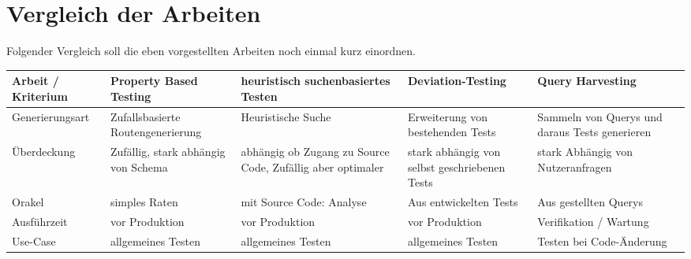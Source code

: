 \section{Vergleich der Arbeiten}
Folgender Vergleich soll die eben vorgestellten Arbeiten noch einmal kurz einordnen.

\begin{center}
    \begin{table}[!hbt]
        \begin{tabularx}{\textwidth}{|C|C|C|C|C|C|}
            \hline
            \textbf{ Arbeit / Kriterium} & \textbf{Property Based Testing} & \textbf{heuristisch suchenbasiertes Testen} & \textbf{Deviation-Testing} & \textbf{Query Harvesting} \\
            \hline
            Generierungsart & Zufallsbasierte Routengenerierung & Heuristische Suche & Erweiterung von bestehenden Tests & Sammeln von Querys und daraus Tests generieren \\
            \hline
            Überdeckung & Zufällig, stark abhängig von Schema  & abhängig ob Zugang zu Source Code, Zufällig aber optimaler & stark abhängig von selbst geschriebenen Tests  & stark Abhängig von Nutzeranfragen \\
            \hline
            Orakel & simples Raten & mit Source Code: Analyse & Aus entwickelten Tests &  Aus gestellten Querys \\
            \hline
            Ausführzeit & vor Produktion & vor Produktion & vor Produktion & Verifikation / Wartung \\
            \hline
            Use-Case & allgemeines Testen & allgemeines Testen & allgemeines Testen & Testen bei Code-Änderung \\
            \hline
        \end{tabularx}
    \end{table}
\end{center}


